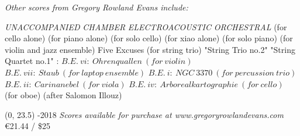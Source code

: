 \documentclass[10pt]{article}
\begin{document}

\begin{center}
\textit{\fontsize{.7cm}{1em}\selectfont Other scores from Gregory Rowland Evans include:} \hfill
\end{center}
\vspace*{4\baselineskip}
{
\begin{center}
\setlength{\columnseprule}{1pt}
\setlength{\columnsep}{6em}

\begin{paracol}{4}
\textit{\fontsize{.5cm}{1em}\selectfont UNACCOMPANIED}
\switchcolumn[1]
\textit{\fontsize{.5cm}{1em}\selectfont CHAMBER}
\switchcolumn[2]
\textit{\fontsize{.5cm}{1em}\selectfont ELECTROACOUSTIC}
\switchcolumn[3]
\textit{\fontsize{.5cm}{1em}\selectfont ORCHESTRAL}
\switchcolumn[0]
 (for cello alone)
\switchcolumn[0]
 (for piano alone)
\switchcolumn[0]
  (for solo cello)
 \switchcolumn[0]
  (for xiao alone)
  \switchcolumn[0]
  (for solo piano)
\switchcolumn[1]
\switchcolumn[1]
 (for violin and jazz ensemble)
\switchcolumn[1]
 Five Excuses (for string trio)
\switchcolumn[1]
 "String Trio no.2"
\switchcolumn[1]
 "String Quartet no.1"
\switchcolumn[2]
:
\switchcolumn[2]
$B.E. \ vi: \ Ohrenquallen \ (for \ violin)$
\switchcolumn[2]
$B.E. \ vii: \ Staub \ (for \ laptop \ ensemble)$
\switchcolumn[2]
$B.E. \ i: \ NGC \ 3370 \ (for \ percussion \ trio)$
\switchcolumn[2]
$B.E. \ ii: \ Carinanebel \ (for \ viola)$
\switchcolumn[2]
$B.E. \ iv: \ Arborealkartographie \ (for \ cello)$
\switchcolumn[2]
 (for oboe)
\switchcolumn[3]
\switchcolumn[3]
 (after Salomon Illouz)
 

\end{paracol}
\end{center}
}

\begin{textblock}{23}(0, 23.5)
-2018 \hfill
\textit{Scores available for purchase at www.gregoryrowlandevans.com} \hfill
\euro 21.44 / \$25
\end{textblock}
\end{document}
